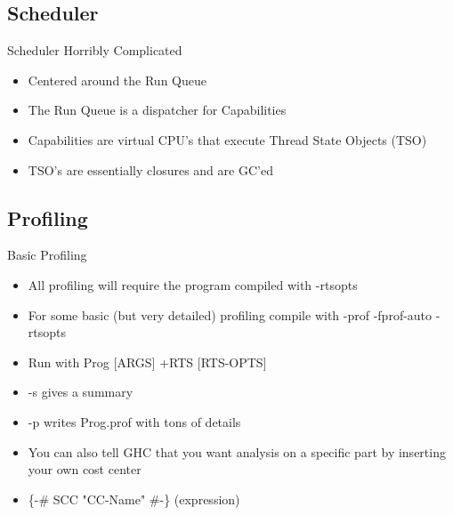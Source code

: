\subsection{Scheduler}
\begin{frame}[t,fragile]{Scheduler}
    Horribly Complicated
    \begin{itemize}[<+->]
        \item Centered around the Run Queue
        \item The Run Queue is a dispatcher for Capabilities
        \item Capabilities are virtual CPU's that execute Thread State Objects (TSO)
        \item TSO's are essentially closures and are GC'ed
    \end{itemize}

\end{frame}

\subsection{Profiling}
\begin{frame}[t]{Basic Profiling}
    \begin{itemize}
        \item<1-> All profiling will require the program compiled with \alert{-rtsopts}
        \item<2-> For some basic (but very detailed) profiling compile with \alert{-prof -fprof-auto -rtsopts}
        \item<3-> Run with Prog [ARGS] +RTS [RTS-OPTS]
        \item<4-> \alert{-s} gives a summary
        \item<5-> \alert{-p} writes Prog.prof with tons of details
    \end{itemize}

    \begin{itemize}
        \item<7-> You can also tell GHC that you want analysis on a specific part by inserting your own cost center
        \item<8-> \alert{\{-\# SCC "CC-Name" \#-\} (expression)}
    \end{itemize}
\end{frame}

